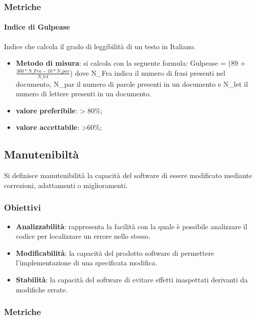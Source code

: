 \subsubsection{Metriche}

\paragraph{Indice di Gulpease}
Indice che calcola il grado di leggibilità di un testo in Italiano.
\begin{itemize}
\item \textbf{Metodo di misura}: si calcola con la seguente formula:
Gulpease = (89 + $\frac{300*N\_Fra - 10*N\_par}{N\_let}$) 
dove N\_Fra indica il numero di frasi presenti nel documento, N\_par il numero di parole presenti in un documento e N\_let il numero di lettere presenti in un documento.
\item \textbf{valore preferibile}: > 80\%;
\item \textbf{valore accettabile}: >60\%;
\end{itemize}

\subsection{Manutenibiltà}

Si definisce manutenibilità la capacità del software di essere modificato mediante correzioni, adattamenti o miglioramenti.

\subsubsection{Obiettivi}
\begin{itemize}
\item \textbf{Analizzabilità}: rappresenta la facilità con la quale è possibile analizzare il codice per localizzare un errore nello stesso.
\item \textbf{Modificabilità}: la capacità del prodotto software di permettere l'implementazione di una specificata modifica.
\item \textbf{Stabilità}: la capacità del software di evitare effetti inaspettati derivanti da modifiche errate.
\end{itemize}

\subsubsection{Metriche}

